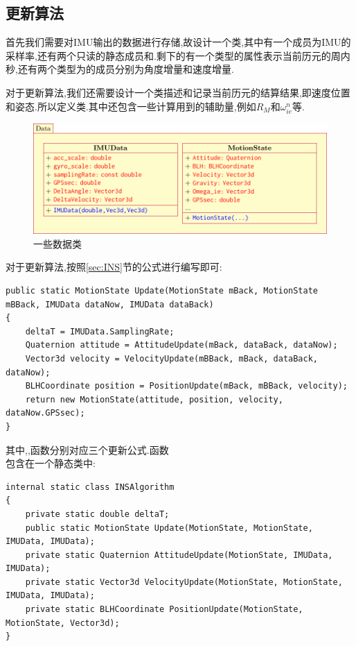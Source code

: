 \documentclass[10pt,a4paper]{ctexart}
\begin{document}
\subsection{更新算法}\label{sec:4.3}

首先我们需要对\textsf{IMU}输出的数据进行存储,故设计一个类,其中有一个成员为\textsf{IMU}的采样率,还有两个只读的静态成员和.剩下的有一个类型的属性表示当前历元的周内秒,还有两个类型为的成员分别为角度增量和速度增量.

对于更新算法,我们还需要设计一个类描述和记录当前历元的结算结果,即速度位置和姿态.所以定义类.其中还包含一些计算用到的辅助量,例如$R_M$和$\omega_{ie}^n$等.
\begin{figure}[H]
\centering
\includegraphics[scale=0.9]{Figures/DataClass.pdf}
\caption{一些数据类}
\label{fig:DataClass}
\end{figure}

对于更新算法,按照\ref{sec:INS}节的公式进行编写即可:
\begin{lstlisting}
public static MotionState Update(MotionState mBack, MotionState mBBack, IMUData dataNow, IMUData dataBack)
{
    deltaT = IMUData.SamplingRate;
    Quaternion attitude = AttitudeUpdate(mBack, dataBack, dataNow);
    Vector3d velocity = VelocityUpdate(mBBack, mBack, dataBack, dataNow);
    BLHCoordinate position = PositionUpdate(mBack, mBBack, velocity);
    return new MotionState(attitude, position, velocity, dataNow.GPSsec);
}
\end{lstlisting}
其中,,函数分别对应三个更新公式.函数\\包含在一个静态类中:
\begin{lstlisting}
internal static class INSAlgorithm
{
    private static double deltaT;
    public static MotionState Update(MotionState, MotionState, IMUData, IMUData);
    private static Quaternion AttitudeUpdate(MotionState, IMUData, IMUData);
    private static Vector3d VelocityUpdate(MotionState, MotionState, IMUData, IMUData);
    private static BLHCoordinate PositionUpdate(MotionState, MotionState, Vector3d);
}
\end{lstlisting}
\end{document}
